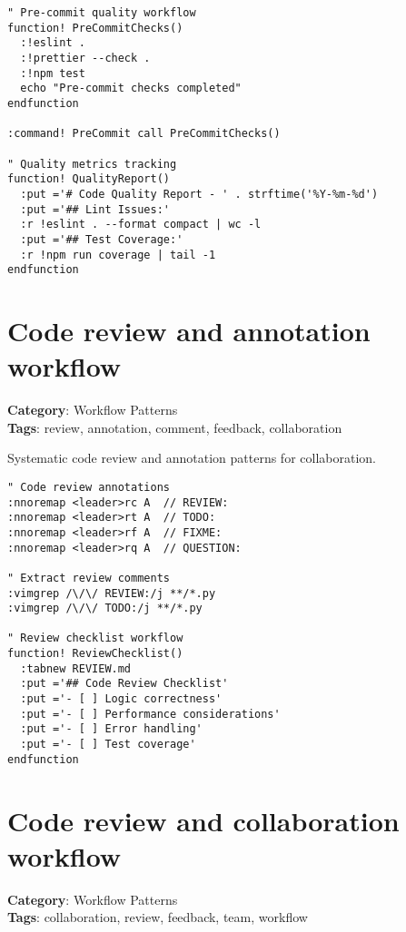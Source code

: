 {{{{{{{{{{{{{{{{{{{\begin{Exa*}{}
\begin{Verbatim}[fontsize=\footnotesize, breaklines, breakanywhere]
" Pre-commit quality workflow
function! PreCommitChecks()
  :!eslint .
  :!prettier --check .
  :!npm test
  echo "Pre-commit checks completed"
endfunction

:command! PreCommit call PreCommitChecks()

" Quality metrics tracking
function! QualityReport()
  :put ='# Code Quality Report - ' . strftime('%Y-%m-%d')
  :put ='## Lint Issues:'
  :r !eslint . --format compact | wc -l
  :put ='## Test Coverage:'
  :r !npm run coverage | tail -1
endfunction
\end{Verbatim}
\end{Exa*}

\section{Code review and annotation workflow}

\textbf{Category}: Workflow Patterns\\ \textbf{Tags}: review, annotation, comment, feedback, collaboration
\vspace{0.5cm}

Systematic code review and annotation patterns for collaboration.

\begin{Exa*}{}
\begin{Verbatim}[fontsize=\footnotesize, breaklines, breakanywhere]
" Code review annotations
:nnoremap <leader>rc A  // REVIEW: 
:nnoremap <leader>rt A  // TODO: 
:nnoremap <leader>rf A  // FIXME: 
:nnoremap <leader>rq A  // QUESTION: 

" Extract review comments
:vimgrep /\/\/ REVIEW:/j **/*.py
:vimgrep /\/\/ TODO:/j **/*.py

" Review checklist workflow
function! ReviewChecklist()
  :tabnew REVIEW.md
  :put ='## Code Review Checklist'
  :put ='- [ ] Logic correctness'
  :put ='- [ ] Performance considerations'
  :put ='- [ ] Error handling'
  :put ='- [ ] Test coverage'
endfunction
\end{Verbatim}
\end{Exa*}

\section{Code review and collaboration workflow}

\textbf{Category}: Workflow Patterns\\ \textbf{Tags}: collaboration, review, feedback, team, workflow
\vspace{0.5cm}

}}}}}}}}}}}}}}}}}}}
